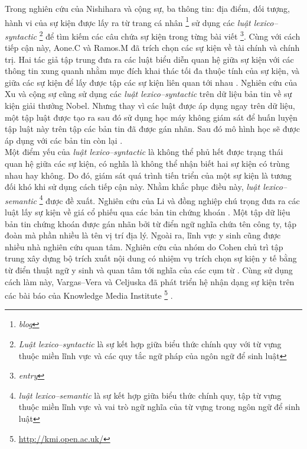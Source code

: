 \noindent Trong nghiên cứu của Nishihara và cộng sự, ba thông tin: địa điểm, đối tượng, hành vi  của  sự kiện được lấy ra từ trang cá nhân \footnote{\emph{blog}} \cite{YKW09} sử dụng các \emph{luật lexico--syntactic} \footnote{\emph{Luật lexico--syntactic} là sự kết hợp giữa biểu thức chính quy với từ vựng thuộc miền lĩnh vực và các quy tắc ngữ pháp của ngôn ngữ để sinh luật} để tìm kiếm các câu chứa sự kiện trong từng bài viết \footnote{\emph{entry}}. Cùng với cách tiếp cận này, Aone.C và Ramos.M đã trích chọn các sự kiện về tài chính và chính trị. Hai tác giả tập trung đưa ra các luật biểu diễn quan hệ giữa sự kiện với các thông tin xung quanh nhằm mục đích khai thác tối đa thuộc tính của sự kiện, và giữa các sự kiện để lấy được tập các sự kiện liên quan tới nhau \cite{CM00}. Nghiên cứu của Xu và cộng sự cũng sử dụng các \emph{luật lexico--syntactic} trên dữ liệu bản tin về sự kiện giải thưởng Nobel. Nhưng thay vì các luật được áp dụng ngay trên dữ liệu, một tập luật được tạo ra sau đó sử dụng học máy không giám sát để huấn luyện tập luật này trên  tập các bản tin đã được gán nhãn.
Sau đó mô hình học sẽ được áp dụng với các bản tin còn lại \cite{FHH06}. \\
\noindent Một điểm yếu của \emph{luật lexico--syntactic} là không thể phủ hết được trạng thái quan hệ giữa các sự kiện, có nghĩa là không thể nhận biết hai sự kiện có trùng nhau hay không. Do đó, giám sát quá trình tiến triển của một sự kiện là tương đối khó khi sử dụng cách tiếp cận này. Nhằm khắc phục điều này, \emph{luật lexico--semantic} \footnote{\emph{luật lexico--semantic} là sự kết hợp giữa biểu thức chính quy, tập từ vựng thuộc miền lĩnh vực và vai trò ngữ nghĩa của từ vựng trong ngôn ngữ để sinh luật} được đề xuất. Nghiên cứu của Li và đồng nghiệp chú trọng đưa ra các luật lấy sự kiện về giá cổ phiếu qua các bản tin chứng khoán \cite{FHD02}. Một tập dữ liệu bản tin chứng khoán được gán nhãn bởi từ điển ngữ nghĩa chứa tên  công ty, tập đoàn mà phần nhiều là tên vị trí địa lý. Ngoài ra, lĩnh vực y sinh cũng được nhiều nhà nghiên cứu quan tâm. Nghiên cứu của nhóm do Cohen chủ trì tập trung xây dựng bộ trích xuất nội dung có nhiệm vụ trích chọn sự kiện y tế bằng từ điển thuật ngữ y sinh và quan tâm tới nghĩa của các cụm từ \cite{CVJ09}. Cùng sử dụng cách làm này, Vargas--Vera và Celjuska đã phát triển hệ nhận dạng sự kiện trên các bài báo của Knowledge Media Institute \footnote{\href{http://kmi.open.ac.uk/}{http://kmi.open.ac.uk/}} \cite{MD04}.\\
